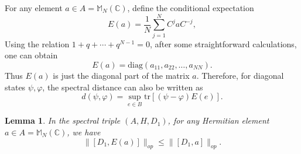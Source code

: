 \documentclass[a4paper,11pt]{article}
\newtheorem{lemma}{Lemma}
\begin{document}
For any element $a \in A = \mathbb{M}_N (\mathbb{C})$, define the conditional
expectation
\begin{equation}\label{ea}
  E (a) = \frac{1}{N}  \sum_{j = 1}^N C^j a C^{- j},
\end{equation}
Using the relation $1 + q + \cdots + q^{N - 1} = 0$, after some
straightforward calculations, one can obtain
\begin{equation}
  E (a) = \mathrm{diag} (a_{11}, a_{22}, \ldots, a_{NN}) .
\end{equation}
Thus $E (a)$ is just the diagonal part of the matrix $a$. Therefore, for
diagonal states $\psi, \varphi$, the spectral distance can also be written as
\begin{equation}
  d (\psi, \varphi) = \sup_{e \in B} \mathrm{tr} [(\psi - \varphi) E (e)] .
\end{equation}
\begin{lemma}\label{dea}
  In the spectral triple $(A, H, D_1)$, for any Hermitian element $a \in A =
   \mathbb{M}_N (\mathbb{C})$, we have
  \begin{equation}
    \|[D_1, E (a)]\|_{op} \leqslant \|[D_1, a]\|_{op} .
  \end{equation}
\end{lemma}
\end{document}
